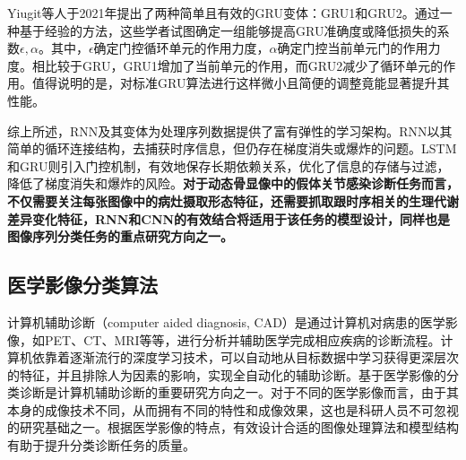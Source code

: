 Yiugit等人\cite{yiugit2021simple}于2021年提出了两种简单且有效的GRU变体：GRU1和GRU2。通过一种基于经验的方法，这些学者试图确定一组能够提高GRU准确度或降低损失的系数\(\epsilon,\alpha\)。其中，\(\epsilon\)确定门控循环单元的作用力度，\(\alpha\)确定门控当前单元门的作用力度。相比较于GRU，GRU1增加了当前单元的作用，而GRU2减少了循环单元的作用。值得说明的是，对标准GRU算法进行这样微小且简便的调整竟能显著提升其性能。

综上所述，RNN及其变体为处理序列数据提供了富有弹性的学习架构。RNN以其简单的循环连接结构，去捕获时序信息，但仍存在梯度消失或爆炸的问题。LSTM和GRU则引入门控机制，有效地保存长期依赖关系，优化了信息的存储与过滤，降低了梯度消失和爆炸的风险。\textbf{对于动态骨显像中的假体关节感染诊断任务而言，不仅需要关注每张图像中的病灶摄取形态特征，还需要抓取跟时序相关的生理代谢差异变化特征，RNN和CNN的有效结合将适用于该任务的模型设计，同样也是图像序列分类任务的重点研究方向之一。}

\subsection{医学影像分类算法}

计算机辅助诊断（computer aided diagnosis, CAD）是通过计算机对病患的医学影像，如PET、CT、MRI等等，进行分析并辅助医学完成相应疾病的诊断流程。计算机依靠着逐渐流行的深度学习技术，可以自动地从目标数据中学习获得更深层次的特征，并且排除人为因素的影响，实现全自动化的辅助诊断。基于医学影像的分类诊断是计算机辅助诊断的重要研究方向之一。对于不同的医学影像而言，由于其本身的成像技术不同，从而拥有不同的特性和成像效果，这也是科研人员不可忽视的研究基础之一。根据医学影像的特点，有效设计合适的图像处理算法和模型结构有助于提升分类诊断任务的质量。

